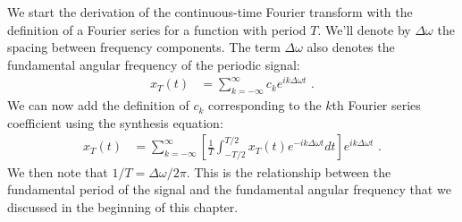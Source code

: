 We start the derivation of the continuous-time Fourier transform with the definition of a Fourier series for a
function with period $T$. We'll denote by $\Delta \omega$ the spacing between frequency components.
The term $\Delta \omega$ also denotes the fundamental angular frequency of the periodic signal:
\begin{align}
  x_{T}(t) & = \sum_{k=-\infty}^{\infty} c_k e^{ik\Delta \omega t}  \,\,.
\end{align}
We can now add the definition of $c_k$ corresponding to the $k$th Fourier series coefficient using the synthesis equation:
\begin{align}
  x_{T}(t) & = \sum_{k=-\infty}^{\infty} \left[\frac{1}{T}\int_{-T/2}^{T/2} x_{T}(t) e^{-ik\Delta \omega t} dt\right]  e^{ik\Delta \omega t}  \,\,.
\end{align}
We then note that $1/T = \Delta \omega/2\pi$. This is the relationship between the fundamental period of
the signal and the fundamental angular frequency that we discussed in the beginning of this chapter.

